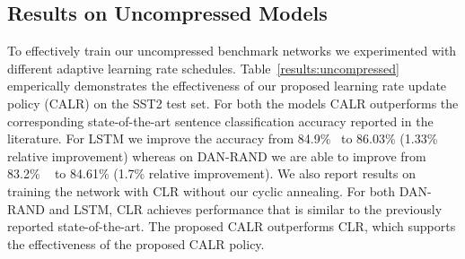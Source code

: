 \subsection{Results on Uncompressed Models}
\label{sec:experiments_uncompresed}
To effectively train our uncompressed benchmark networks we experimented with
different adaptive learning rate schedules. Table~\ref{results:uncompressed}
emperically demonstrates the effectiveness of our proposed learning rate update
policy (CALR) on the SST2 test set. For both the
models CALR outperforms the corresponding state-of-the-art sentence
classification accuracy reported in the literature. For LSTM we improve the
accuracy from 84.9\%~\cite{socher2013recursive} to 86.03\% (1.33\% relative
improvement) whereas on DAN-RAND we are able to improve from 83.2\%
~\cite{iyyer2015deep} to 84.61\% (1.7\% relative improvement). We also report
results on training the network with CLR without our cyclic annealing. For both
DAN-RAND and LSTM, CLR achieves performance that is similar to the previously reported state-of-the-art. The proposed CALR outperforms CLR, which supports the effectiveness of the proposed CALR policy.

